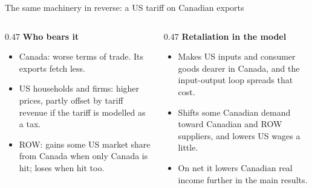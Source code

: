 \documentclass[aspectratio=169,9pt,t]{beamer}
\begin{document}
\begin{frame}{The same machinery in reverse: a US tariff on Canadian exports}
  \medskip
  \begin{columns}[T]
    \begin{column}{0.47\textwidth}
      \small
      \textbf{Who bears it}
      \begin{itemize}
        \item Canada: worse terms of trade. Its exports fetch less.
        \item US households and firms: higher prices, partly offset by
              tariff revenue if the tariff is modelled as a tax.
        \item ROW: gains some US market share from Canada when only
              Canada is hit; loses when hit too.
      \end{itemize}
    \end{column}
    \begin{column}{0.47\textwidth}
      \small
      \textbf{Retaliation in the model}
      \begin{itemize}
        \item Makes US inputs and consumer goods dearer in Canada, and
              the input-output loop spreads that cost.
        \item Shifts some Canadian demand toward Canadian and ROW
              suppliers, and lowers US wages a little.
        \item On net it lowers Canadian real income further in the
              main results.
      \end{itemize}
    \end{column}
  \end{columns}
\end{frame}
\end{document}
